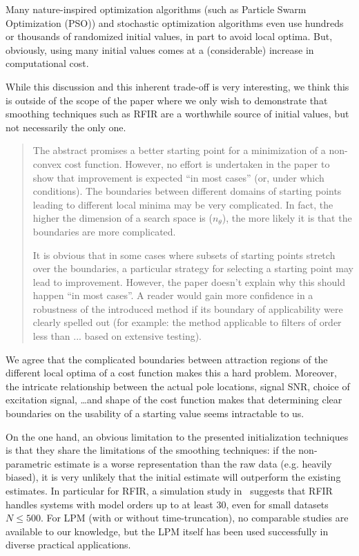 Many nature-inspired optimization algorithms (such as Particle Swarm Optimization (PSO)) and stochastic optimization algorithms even use hundreds or thousands of randomized initial values, in part to avoid local optima.
But, obviously, using many initial values comes at a (considerable) increase in computational cost.

While this discussion and this inherent trade-off is very interesting, we think this is outside of the scope of the paper where we only wish to demonstrate that smoothing techniques such as RFIR are a worthwhile source of initial values, but not necessarily the only one.

\begin{quote}
The abstract promises a better starting point for a minimization of a non-convex cost function. However, no effort is undertaken in the paper to show that improvement is expected ``in most cases'' (or, under which conditions). The boundaries between different domains of starting points leading to different local minima may be very complicated. In fact, the higher the dimension of a search space is ($n_{\theta}$), the more likely it is that the boundaries are more complicated. 

It is obvious that in some cases where subsets of starting points stretch over the boundaries, a particular strategy for selecting a starting point may lead to improvement. However, the paper doesn't explain why this should happen ``in most cases''. A reader would gain more confidence in a robustness of the introduced method if its boundary of applicability were clearly spelled out (for example: the method applicable to filters of order less than ... based on extensive testing). 
\end{quote}

We agree that the complicated boundaries between attraction regions of the different local optima of a cost function makes this a hard problem.
Moreover, the intricate relationship between the actual pole locations, signal SNR, choice of excitation signal, \ldots and shape of the cost function makes that determining clear boundaries on the usability of a starting value seems intractable to us.

On the one hand, an obvious limitation to the presented initialization techniques is that they share the limitations of the smoothing techniques: if the non-parametric estimate is a worse representation than the raw data (e.g. heavily biased), it is very unlikely that the initial estimate will outperform the existing estimates.
In particular for RFIR, a simulation study in~\cite{Chen2013} suggests that RFIR handles systems with model orders up to at least $30$, even for small datasets $N\leq 500$.
For LPM (with or without time-truncation), no comparable studies are available to our knowledge, but the LPM itself has been used successfully in diverse practical applications.

